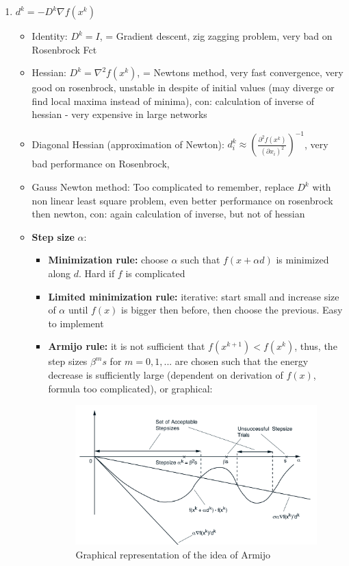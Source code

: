\documentclass{report}
\begin{document}
\begin{enumerate}
\item $d^k = -D^k \nabla f (x^k )$
\begin{itemize}
	\item Identity: $D^k = I$, = Gradient descent, zig zagging problem, very bad on Rosenbrock Fct
	\item Hessian: $D^k = \nabla^2 f(x^k)$, = Newtons method, very fast convergence, very good on rosenbrock, unstable in despite of initial values (may diverge or find local maxima instead of minima), con: calculation of inverse of hessian - very expensive in large networks
	\item Diagonal Hessian (approximation of Newton): $d_i^k \approx \left(
\frac{\partial^2  f (x^k)}{(\partial x_i)^2}
\right)^{-1}$, very bad performance on Rosenbrock, 
	\item Gauss Newton method: Too complicated to remember, replace $D^k$ with non linear least square problem, even better performance on rosenbrock then newton, con: again calculation of inverse, but not of hessian
	\item \textbf{Step size} $\alpha$: 
	\begin{itemize}
		\item \textbf{Minimization rule:} choose $\alpha$ such that $f(x + \alpha d)$ is minimized along $d$. Hard if $f$ is complicated
		\item \textbf{Limited minimization rule:} iterative: start small and increase size of $\alpha$ until $f(x)$ is bigger then before, then choose the previous. Easy to implement
		\item \textbf{Armijo rule:} it is not sufficient that $f(x^{k+1}) < f(x^k)$, thus, the step sizes $\beta^ms$ for $m = 0,1,...$ are chosen such that the energy decrease is sufficiently large (dependent on derivation of $f(x)$, formula too complicated), or graphical:
	\begin{figure}[H]
	\includegraphics[width=\textwidth]{armijo.png}
	\caption{Graphical representation of the idea of Armijo\label{fig:desc_dir}}
	\end{figure}
		

\end{itemize}
\end{itemize}
\end{enumerate}
\end{document}
